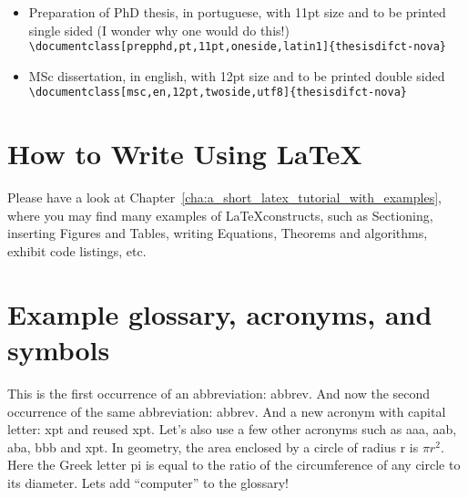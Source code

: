 \begin{itemize}
	\item Preparation of PhD thesis, in portuguese, with 11pt size and to be printed single sided (I wonder why one would do this!)\\
	\verb!\documentclass[prepphd,pt,11pt,oneside,latin1]{thesisdifct-nova}!
	\item MSc dissertation, in english, with 12pt size and to be printed double sided\\
	\verb!\documentclass[msc,en,12pt,twoside,utf8]{thesisdifct-nova}!
\end{itemize}

\section{How to Write Using \LaTeX} %
\label{sec:how_to_write_using_latex}

Please have a look at Chapter~\ref{cha:a_short_latex_tutorial_with_examples}, where you may find many examples of \LaTeX constructs, such as Sectioning, inserting Figures and Tables, writing Equations, Theorems and algorithms, exhibit code listings, etc.




\section{Example glossary, acronyms, and symbols}
%
%
This is the first occurrence of an abbreviation: \gls{abbrev}. And now the second occurrence of the same abbreviation: \gls{abbrev}. And a new acronym with capital letter: \Gls{xpt} and reused \gls{xpt}.  Let's also use a few other acronyms such as \gls{aaa}, \gls{aab}, \gls{aba}, \gls{bbb} and \gls{xpt}.
In geometry, the area enclosed by a circle of radius \gls{r} is $\pi r^2$. Here the Greek letter \gls{pi} is equal to the ratio of the circumference of any circle to its diameter.
Lets add ``\gls{computer}'' to the glossary!
%




